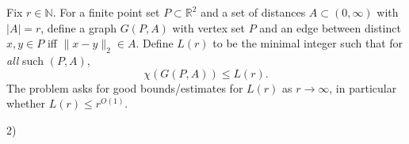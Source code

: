 Fix $r\in\mathbb{N}$.
For a finite point set $P\subset\mathbb{R}^2$ and a set of distances $A\subset(0,\infty)$ with $|A|=r$, define a graph $G(P,A)$ with vertex set $P$ and an edge between distinct $x,y\in P$ iff $\|x-y\|_2\in A$.
Define $L(r)$ to be the minimal integer such that for \emph{all} such $(P,A)$,
\[
\chi(G(P,A))\le L(r).
\]
The problem asks for good bounds/estimates for $L(r)$ as $r\to\infty$, in particular whether $L(r)\le r^{O(1)}$.

2)
